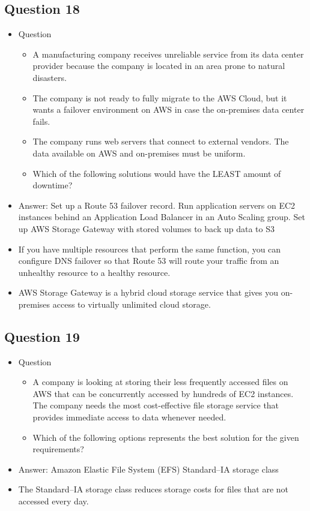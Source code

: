 \documentclass[]{scrartcl}
\begin{document}
\subsection{Question 18}
\begin{itemize}
	\item Question
	\begin{itemize}
		\item A manufacturing company receives unreliable service from its data center provider because the company is located in an area prone to natural disasters. 
		\item The company is not ready to fully migrate to the AWS Cloud, but it wants a failover environment on AWS in case the on-premises data center fails. 
		\item The company runs web servers that connect to external vendors. The data available on AWS and on-premises must be uniform.
		\item Which of the following solutions would have the LEAST amount of downtime?
	\end{itemize}
	\item Answer: Set up a Route 53 failover record. Run application servers on EC2 instances behind an Application Load Balancer in an Auto Scaling group. Set up AWS Storage Gateway with stored volumes to back up data to S3
	\item If you have multiple resources that perform the same function, you can configure DNS failover so that Route 53 will route your traffic from an unhealthy resource to a healthy resource.
	\item AWS Storage Gateway is a hybrid cloud storage service that gives you on-premises access to virtually unlimited cloud storage.
\end{itemize}

\subsection{Question 19}
\begin{itemize}
	\item Question
	\begin{itemize}
		\item A company is looking at storing their less frequently accessed files on AWS that can be concurrently accessed by hundreds of EC2 instances. The company needs the most cost-effective file storage service that provides immediate access to data whenever needed.
		\item Which of the following options represents the best solution for the given requirements?
	\end{itemize}
	\item Answer: Amazon Elastic File System (EFS) Standard–IA storage class
	\item The Standard–IA storage class reduces storage costs for files that are not accessed every day.
\end{itemize}
\end{document}
